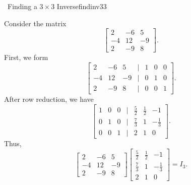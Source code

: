         \begin{example}{\Difficulty\,\Difficulty\,\,Finding a \(3\times 3\) Inverse}{findinv33}
            
            Consider the matrix 
            \begin{equation*}
                \begin{bmatrix}
                    2 & -6 & 5 \\
                    -4 & 12 & -9 \\
                    2 & -9 & 8
                \end{bmatrix}.
            \end{equation*}
            First, we form
            \begin{equation*}
                \begin{bmatrix}
                    2 & -6 & 5 & | & 1 & 0 & 0 \\
                    -4 & 12 & -9 & | & 0 & 1 & 0 \\
                    2 & -9 & 8 & | & 0 & 0 & 1
                \end{bmatrix}.
            \end{equation*}
            After row reduction, we have
            \begin{equation*}
                \begin{bmatrix}
                    1 & 0 & 0 & | & \frac{5}{2} & \frac{1}{2} & -1 \\
                    0 & 1 & 0 & | & \frac{7}{3} & 1 & -\frac{1}{3} \\
                    0 & 0 & 1 & | & 2 & 1 & 0
                \end{bmatrix}.
            \end{equation*}
            Thus, 
            \begin{equation*}
                \begin{bmatrix}
                    2 & -6 & 5 \\
                    -4 & 12 & -9 \\
                    2 & -9 & 8
                \end{bmatrix}
                \begin{bmatrix}
                    \frac{5}{2} & \frac{1}{2} & -1 \\
                    \frac{7}{3} & 1 & -\frac{1}{3} \\
                    2 & 1 & 0
                \end{bmatrix}=I_3.
            \end{equation*}

            
        \end{example}
